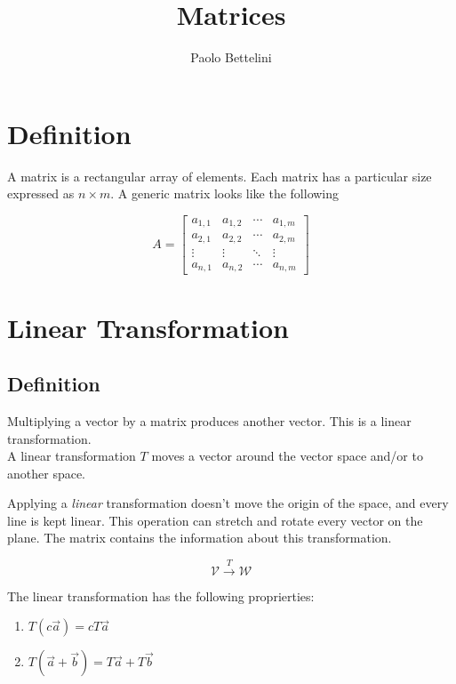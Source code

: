 \documentclass[a4paper]{article}
\title{Matrices}
\author{Paolo Bettelini}
\date{}
\begin{document}
\maketitle
\tableofcontents
\pagebreak

\section{Definition}

A matrix is a rectangular array of elements.
Each matrix has a particular size expressed as \(n \times m\).
A generic matrix looks like the following

\[
A = \begin{bmatrix} 
        a_{1,1} & a_{1,2} & \cdots & a_{1,m} \\
        a_{2,1} & a_{2,2} & \cdots & a_{2,m} \\
        \vdots  & \vdots  & \ddots & \vdots  \\
        a_{n,1} & a_{n,2} & \cdots & a_{n,m} 
    \end{bmatrix}
\]

\section{Linear Transformation}

\subsection{Definition}

Multiplying a vector by a matrix produces another vector. This is a linear transformation. \\
A linear transformation \(T\) moves a vector around the vector space and/or to another space.

Applying a \textit{linear} transformation doesn't move the origin of the space, and every line
is kept linear. This operation can stretch and rotate every vector on the plane.
The matrix contains the information about this transformation.

\[
    \mathcal{V} \xrightarrow{T} \mathcal{W}
\]

The linear transformation has the following proprierties:

\begin{enumerate}
    \item \(T(c\vec{a})=cT\vec{a}\)
    \item \(T(\vec{a} + \vec{b}) = T\vec{a} + T\vec{b}\)
\end{enumerate}
\end{document}
